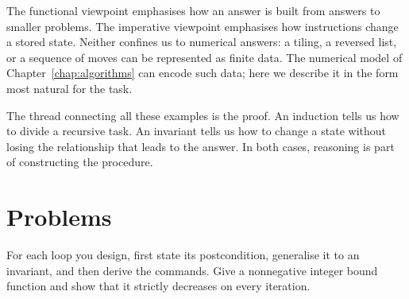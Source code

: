 The functional viewpoint emphasises how an answer is built from answers
to smaller problems. The imperative viewpoint emphasises how instructions
change a stored state. Neither confines us to numerical answers: a tiling,
a reversed list, or a sequence of moves can be represented as finite data.
The numerical model of Chapter~\ref{chap:algorithms} can encode such data; here
we describe it in the form most natural for the task.

The thread connecting all these examples is the proof. An induction tells
us how to divide a recursive task. An invariant tells us how to change a
state without losing the relationship that leads to the answer. In both
cases, reasoning is part of constructing the procedure.

\section*{Problems}
For each loop you design, first state its postcondition, generalise it to
an invariant, and then derive the commands. Give a nonnegative integer
bound function and show that it strictly decreases on every iteration.
